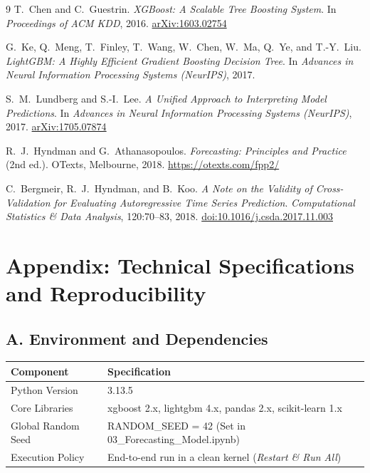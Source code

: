 \documentclass[10pt]{article}
\begin{document}
\begin{thebibliography}{9}
\small
{}
T.\ Chen and C.\ Guestrin.
\textit{XGBoost: A Scalable Tree Boosting System}.
In \emph{Proceedings of ACM KDD}, 2016.
\href{https://doi.org/10.48550/arXiv.1603.02754}{arXiv:1603.02754}

G.\ Ke, Q.\ Meng, T.\ Finley, T.\ Wang, W.\ Chen, W.\ Ma, Q.\ Ye,
and T.-Y.\ Liu.
\textit{LightGBM: A Highly Efficient Gradient Boosting Decision Tree}.
In \emph{Advances in Neural Information Processing Systems (NeurIPS)}, 2017.

S.\ M.\ Lundberg and S.-I.\ Lee.
\textit{A Unified Approach to Interpreting Model Predictions}.
In \emph{Advances in Neural Information Processing Systems (NeurIPS)}, 2017.
\href{https://doi.org/10.48550/arXiv.1705.07874}{arXiv:1705.07874}

R.\ J.\ Hyndman and G.\ Athanasopoulos.
\textit{Forecasting: Principles and Practice} (2nd ed.).
OTexts, Melbourne, 2018.
\url{https://otexts.com/fpp2/}

C.\ Bergmeir, R.\ J.\ Hyndman, and B.\ Koo.
\textit{A Note on the Validity of Cross-Validation for Evaluating Autoregressive Time Series Prediction}.
\emph{Computational Statistics \& Data Analysis}, 120:70--83, 2018.
\href{https://doi.org/10.1016/j.csda.2017.11.003}{doi:10.1016/j.csda.2017.11.003}
\end{thebibliography}

\section*{Appendix: Technical Specifications and Reproducibility}

\subsection*{A. Environment and Dependencies}
\begin{table}[H]
\centering
\small
\begin{tabular}{ll}
\toprule
\textbf{Component} & \textbf{Specification} \\
\midrule
Python Version     & 3.13.5 \\
Core Libraries     & xgboost 2.x, lightgbm 4.x, pandas 2.x, scikit-learn 1.x \\
Global Random Seed & RANDOM\_SEED = 42 (Set in 03\_Forecasting\_Model.ipynb) \\
Execution Policy   & End-to-end run in a clean kernel (\emph{Restart \& Run All}) \\
\bottomrule
\end{tabular}
\end{table}
\end{document}
